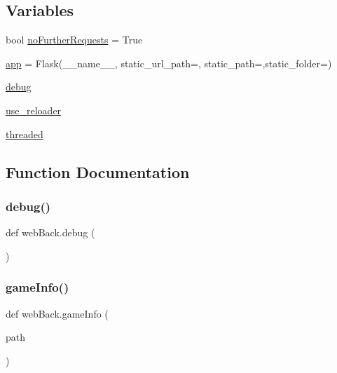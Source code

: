 \subsection*{Variables}
\begin{DoxyCompactItemize}
\item 
bool \hyperlink{namespaceweb_back_a54be33696aa638ea93d5b7bd190da106}{no\+Further\+Requests} = True
\item 
\hyperlink{namespaceweb_back_afe63fea7be31b0200b496d08bc6b517d}{app} = Flask(\+\_\+\+\_\+name\+\_\+\+\_\+, static\+\_\+url\+\_\+path=\textquotesingle{}\textquotesingle{}, static\+\_\+path=\textquotesingle{}\textquotesingle{},static\+\_\+folder=\textquotesingle{}\textquotesingle{})
\item 
\hyperlink{namespaceweb_back_a0514aabed091ee5e2f35766eb01eced6}{debug}
\item 
\hyperlink{namespaceweb_back_a33f3d888c60d659e953c90c18f532678}{use\+\_\+reloader}
\item 
\hyperlink{namespaceweb_back_a47e597222ad8ae582ae1306ab3d3d395}{threaded}
\end{DoxyCompactItemize}


\subsection{Function Documentation}
\hypertarget{namespaceweb_back_a2966f9911dbe98fd9e2cc63ce6458731}{}\label{namespaceweb_back_a2966f9911dbe98fd9e2cc63ce6458731} 
\subsubsection{\texorpdfstring{debug()}{debug()}}
{\footnotesize\ttfamily def web\+Back.\+debug (\begin{DoxyParamCaption}{ }\end{DoxyParamCaption})}

\hypertarget{namespaceweb_back_a586d6d3a74f2479f390486276186a626}{}\label{namespaceweb_back_a586d6d3a74f2479f390486276186a626} 
\subsubsection{\texorpdfstring{game\+Info()}{gameInfo()}}
{\footnotesize\ttfamily def web\+Back.\+game\+Info (\begin{DoxyParamCaption}\item[{}]{path }\end{DoxyParamCaption})}

